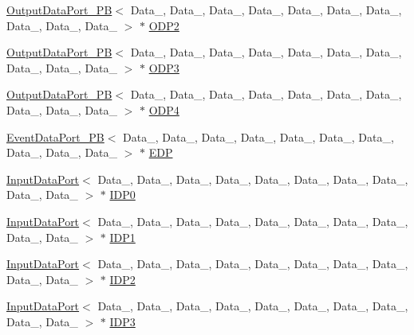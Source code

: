 \begin{DoxyCompactItemize}
\item 
\hyperlink{classOutputDataPort__PB}{Output\+Data\+Port\+\_\+\+PB}$<$ Data\+\_, Data\+\_, Data\+\_, Data\+\_, Data\+\_, Data\+\_, Data\+\_, Data\+\_, Data\+\_, Data\+\_ $>$ $\ast$ \hyperlink{classProcessingBlock_aac2c071b5f31f6548eea0dd387148bc9}{O\+D\+P2}
\item 
\hyperlink{classOutputDataPort__PB}{Output\+Data\+Port\+\_\+\+PB}$<$ Data\+\_, Data\+\_, Data\+\_, Data\+\_, Data\+\_, Data\+\_, Data\+\_, Data\+\_, Data\+\_, Data\+\_ $>$ $\ast$ \hyperlink{classProcessingBlock_a4fa4bd960336e16b020bed41376c6fe5}{O\+D\+P3}
\item 
\hyperlink{classOutputDataPort__PB}{Output\+Data\+Port\+\_\+\+PB}$<$ Data\+\_, Data\+\_, Data\+\_, Data\+\_, Data\+\_, Data\+\_, Data\+\_, Data\+\_, Data\+\_, Data\+\_ $>$ $\ast$ \hyperlink{classProcessingBlock_a144a5c91e1033f542205597f6633856b}{O\+D\+P4}
\item 
\hyperlink{classEventDataPort__PB}{Event\+Data\+Port\+\_\+\+PB}$<$ Data\+\_, Data\+\_, Data\+\_, Data\+\_, Data\+\_, Data\+\_, Data\+\_, Data\+\_, Data\+\_, Data\+\_ $>$ $\ast$ \hyperlink{classProcessingBlock_a31a0bf1c1d88a5f5bb1ce325a61eba54}{E\+DP}
\item 
\hyperlink{classInputDataPort}{Input\+Data\+Port}$<$ Data\+\_, Data\+\_, Data\+\_, Data\+\_, Data\+\_, Data\+\_, Data\+\_, Data\+\_, Data\+\_, Data\+\_ $>$ $\ast$ \hyperlink{classProcessingBlock_a44bddb9d36619bdd78a73459e432e51c}{I\+D\+P0}
\item 
\hyperlink{classInputDataPort}{Input\+Data\+Port}$<$ Data\+\_, Data\+\_, Data\+\_, Data\+\_, Data\+\_, Data\+\_, Data\+\_, Data\+\_, Data\+\_, Data\+\_ $>$ $\ast$ \hyperlink{classProcessingBlock_ad94bfed08d29895f22b8fcb80cabc0c0}{I\+D\+P1}
\item 
\hyperlink{classInputDataPort}{Input\+Data\+Port}$<$ Data\+\_, Data\+\_, Data\+\_, Data\+\_, Data\+\_, Data\+\_, Data\+\_, Data\+\_, Data\+\_, Data\+\_ $>$ $\ast$ \hyperlink{classProcessingBlock_aeb1490363515b921c207ff9197f3e46f}{I\+D\+P2}
\item 
\hyperlink{classInputDataPort}{Input\+Data\+Port}$<$ Data\+\_, Data\+\_, Data\+\_, Data\+\_, Data\+\_, Data\+\_, Data\+\_, Data\+\_, Data\+\_, Data\+\_ $>$ $\ast$ \hyperlink{classProcessingBlock_aa069c4cf51aec1b0b2887fea6f2fe1cb}{I\+D\+P3}
\item 

\end{DoxyCompactItemize}
